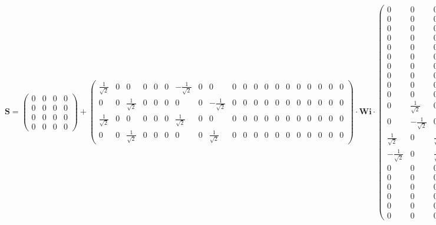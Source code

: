 \[ \mathbf{S} = \left(\begin{array}{cccc} 0 & 0 & 0 & 0 \\ 0 & 0 & 0 &
0 \\ 0 & 0 & 0 & 0 \\ 0 & 0 & 0 & 0 \end{array}\right) +
\left(\begin{array}{cccccccccccccccccccc} \frac{1}{\sqrt{2}} & 0 & 0 &
0 & 0 & 0 & -\frac{1}{\sqrt{2}} & 0 & 0 & 0 & 0 & 0 & 0 & 0 & 0 & 0 &
0 & 0 & 0 & 0 \\ 0 & 0 & \frac{1}{\sqrt{2}} & 0 & 0 & 0 & 0 & 0 &
-\frac{1}{\sqrt{2}} & 0 & 0 & 0 & 0 & 0 & 0 & 0 & 0 & 0 & 0 & 0 \\
\frac{1}{\sqrt{2}} & 0 & 0 & 0 & 0 & 0 & \frac{1}{\sqrt{2}} & 0 & 0 &
0 & 0 & 0 & 0 & 0 & 0 & 0 & 0 & 0 & 0 & 0 \\ 0 & 0 &
\frac{1}{\sqrt{2}} & 0 & 0 & 0 & 0 & 0 & \frac{1}{\sqrt{2}} & 0 & 0 &
0 & 0 & 0 & 0 & 0 & 0 & 0 & 0 & 0 \end{array}\right) \cdot \mathbf{Wi}
\cdot\left(\begin{array}{cccc} 0 & 0 & 0 & 0 \\ 0 & 0 & 0 & 0 \\ 0 & 0
& 0 & 0 \\ 0 & 0 & 0 & 0 \\ 0 & 0 & 0 & 0 \\ 0 & 0 & 0 & 0 \\ 0 & 0 &
0 & 0 \\ 0 & 0 & 0 & 0 \\ 0 & 0 & 0 & 0 \\ 0 & 0 & 0 & 0 \\ 0 &
\frac{1}{\sqrt{2}} & 0 & \frac{1}{\sqrt{2}} \\ 0 & -\frac{1}{\sqrt{2}}
& 0 & \frac{1}{\sqrt{2}} \\ \frac{1}{\sqrt{2}} & 0 &
\frac{1}{\sqrt{2}} & 0 \\ -\frac{1}{\sqrt{2}} & 0 & \frac{1}{\sqrt{2}}
& 0 \\ 0 & 0 & 0 & 0 \\ 0 & 0 & 0 & 0 \\ 0 & 0 & 0 & 0 \\ 0 & 0 & 0 &
0 \\ 0 & 0 & 0 & 0 \\ 0 & 0 & 0 & 0 \end{array}\right) \]
